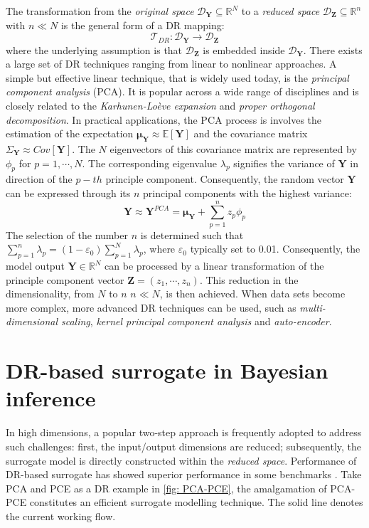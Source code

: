 The transformation from the \textit{original space} $\mathcal{D}_{\boldsymbol{Y}} \subseteq \mathbb{R}^{N}$ to a \textit{reduced space} $\mathcal{D}_{\boldsymbol{Z}} \subseteq \mathbb{R}^{n}$ with $n \ll N$ is the general form of a \acrshort{DR} mapping:
\begin{equation}
    \mathcal{T}_{DR} : \mathcal{D}_{\boldsymbol{Y}} \rightarrow \mathcal{D}_{\boldsymbol{Z}}
\end{equation}
where the underlying assumption is that $\mathcal{D}_{\boldsymbol{Z}}$ is embedded inside $\mathcal{D}_{\boldsymbol{Y}}$. There exists a large set of \acrshort{DR} techniques ranging from linear to nonlinear approaches. A simple but effective linear technique, that is widely used today, is the \textit{principal component analysis} (\acrshort{PCA}). It is popular across a wide range of disciplines and is closely related to the \textit{Karhunen-Loève expansion} and \textit{proper orthogonal decomposition}. In practical applications, the \acrshort{PCA} process is involves the estimation of the expectation $\boldsymbol{\mu_{Y}} \approx \mathbb{E}[\boldsymbol{Y}]$ and the covariance matrix $\Sigma_{\boldsymbol{Y}} \approx Cov[\boldsymbol{Y}]$. The $N$ eigenvectors of this covariance matrix are represented by $\phi_{p}$ for $p=1,\cdots,N$. The corresponding eigenvalue $\lambda_{p}$ signifies the variance of $\boldsymbol{Y}$ in direction of the $p-th$ principle component. Consequently, the random vector $\boldsymbol{Y}$ can be expressed through its $n$ principal components with the highest variance:
\begin{equation}
\boldsymbol{Y} \approx \boldsymbol{Y}^{PCA} 
= \boldsymbol{\mu_{Y}} + 
\sum_{p=1}^{n} z_{p}\phi_{p}
\end{equation}
The selection of the number $n$ is determined such that $\sum_{p=1}^{n} \lambda_{p} = 
(1-\varepsilon_{0})\sum_{p=1}^{N} \lambda_{p}$, where $\varepsilon_{0}$ typically set to 0.01. Consequently, the model output $\boldsymbol{Y} \in \mathbb{R}^{N}$ can be processed by a linear transformation of the principle component vector $\boldsymbol{Z} = (z_{1},\cdots,z_{n})$. This reduction in the dimensionality, from $N$ to $n$ $n \ll N$, is then achieved. When data sets become more complex, more advanced \acrshort{DR} techniques can be used, such as \textit{multi-dimensional scaling}, \textit{kernel principal component analysis} and \textit{auto-encoder}.


\section{DR-based surrogate in Bayesian inference}
In high dimensions, a popular two-step approach is frequently adopted to address such challenges: first, the input/output dimensions are reduced; subsequently, the surrogate model is directly constructed within the \textit{reduced space}. Performance of DR-based surrogate has showed superior performance in some benchmarks \citep{lataniotis2019}. Take \acrshort{PCA} and \acrshort{PCE} as a \acrshort{DR} example in \cref{fig: PCA-PCE}, the amalgamation of \acrshort{PCA}-\acrshort{PCE} constitutes an efficient surrogate modelling technique. The solid line denotes the current working flow. 

